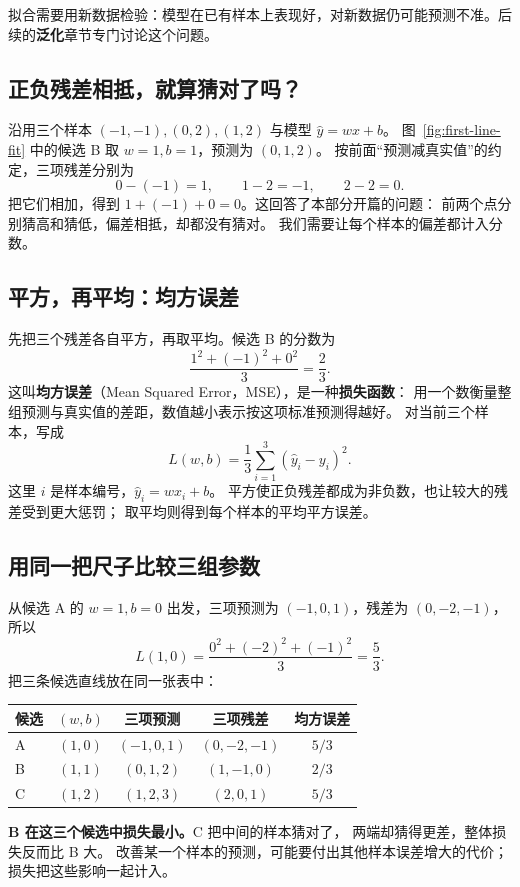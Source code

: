 拟合需要用新数据检验：模型在已有样本上表现好，对新数据仍可能预测不准。后续的\textbf{泛化}章节专门讨论这个问题。



\subsection{正负残差相抵，就算猜对了吗？}
\label{concept:loss}

沿用三个样本 $(-1,-1),(0,2),(1,2)$ 与模型 $\widehat{y}=wx+b$。
图~\ref{fig:first-line-fit} 中的候选 B 取 $w=1,b=1$，预测为 $(0,1,2)$。
按前面“预测减真实值”的约定，三项残差分别为
\[
0-(-1)=1,\qquad 1-2=-1,\qquad 2-2=0.
\]
\label{partq:learning}
把它们相加，得到 $1+(-1)+0=0$。这回答了本部分开篇的问题：
前两个点分别猜高和猜低，偏差相抵，却都没有猜对。
我们需要让每个样本的偏差都计入分数。

\subsection{平方，再平均：均方误差}

先把三个残差各自平方，再取平均。候选 B 的分数为
\[
\frac{1^2+(-1)^2+0^2}{3}=\frac23.
\]
这叫\textbf{均方误差}（Mean Squared Error，MSE），是一种\textbf{损失函数}：
用一个数衡量整组预测与真实值的差距，数值越小表示按这项标准预测得越好。
对当前三个样本，写成
\begin{equation}
\boxed{L(w,b)=\frac13\sum_{i=1}^{3}(\widehat{y}_i-y_i)^2.}
\label{eq:three-point-mse}
\end{equation}
这里 $i$ 是样本编号，$\widehat{y}_i=wx_i+b$。
平方使正负残差都成为非负数，也让较大的残差受到更大惩罚；
取平均则得到每个样本的平均平方误差。

\subsection{用同一把尺子比较三组参数}

从候选 A 的 $w=1,b=0$ 出发，三项预测为 $(-1,0,1)$，残差为 $(0,-2,-1)$，所以
\[
L(1,0)=\frac{0^2+(-2)^2+(-1)^2}{3}=\boxed{\frac53}.
\]
把三条候选直线放在同一张表中：
\begin{center}
\begin{tabular}{lcccc}
\toprule
候选 & $(w,b)$ & 三项预测 & 三项残差 & 均方误差\\\midrule
A & $(1,0)$ & $(-1,0,1)$ & $(0,-2,-1)$ & $5/3$\\
B & $(1,1)$ & $(0,1,2)$ & $(1,-1,0)$ & $2/3$\\
C & $(1,2)$ & $(1,2,3)$ & $(2,0,1)$ & $5/3$\\
\bottomrule
\end{tabular}
\end{center}
\textbf{B 在这三个候选中损失最小。}C 把中间的样本猜对了，
两端却猜得更差，整体损失反而比 B 大。
改善某一个样本的预测，可能要付出其他样本误差增大的代价；损失把这些影响一起计入。

